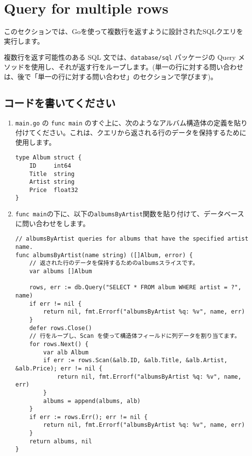 \section{Query for multiple rows}

このセクションでは、Goを使って複数行を返すように設計されたSQLクエリを実行します。

複数行を返す可能性のある SQL 文では、\texttt{database/sql} パッケージの Query メソッドを使用し、それが返す行をループします。(単一の行に対する問い合わせは、後で「単一の行に対する問い合わせ」のセクションで学びます)。

\subsection{コードを書いてください}

\begin{enumerate}

\item \texttt{main.go} の \texttt{func main} のすぐ上に、次のようなアルバム構造体の定義を貼り付けてください。これは、クエリから返される行のデータを保持するために使用します。

\begin{lstlisting}[numbers=none]
type Album struct {
    ID     int64
    Title  string
    Artist string
    Price  float32
}
\end{lstlisting}

\item \texttt{func main}の下に、以下の\texttt{albumsByArtist}関数を貼り付けて、データベースに問い合わせをします。

\begin{lstlisting}[numbers=none]
// albumsByArtist queries for albums that have the specified artist name.
func albumsByArtist(name string) ([]Album, error) {
    // 返された行のデータを保持するためのalbumsスライスです。
    var albums []Album

    rows, err := db.Query("SELECT * FROM album WHERE artist = ?", name)
    if err != nil {
        return nil, fmt.Errorf("albumsByArtist %q: %v", name, err)
    }
    defer rows.Close()
    // 行をループし、Scan を使って構造体フィールドに列データを割り当てます。
    for rows.Next() {
        var alb Album
        if err := rows.Scan(&alb.ID, &alb.Title, &alb.Artist, &alb.Price); err != nil {
            return nil, fmt.Errorf("albumsByArtist %q: %v", name, err)
        }
        albums = append(albums, alb)
    }
    if err := rows.Err(); err != nil {
        return nil, fmt.Errorf("albumsByArtist %q: %v", name, err)
    }
    return albums, nil
}
\end{lstlisting}



\end{enumerate}
